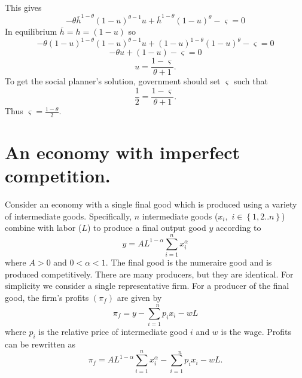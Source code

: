 \documentclass{sebase}
\begin{document}
This gives%
\begin{equation*}
-\theta \overline{h}^{1-\theta }(1-u)^{\theta -1}u+\overline{h}^{1-\theta
}(1-u)^{\theta }-\varsigma =0
\end{equation*}%
In equilibrium $\overline{h}=h=(1-u)$ so 
\begin{equation*}
-\theta \left( 1-u\right) ^{1-\theta }(1-u)^{\theta -1}u+(1-u)^{1-\theta
}(1-u)^{\theta }-\varsigma =0
\end{equation*}%
\begin{equation*}
-\theta u+(1-u)-\varsigma =0
\end{equation*}%
\begin{equation*}
u=\frac{1-\varsigma }{\theta +1}.
\end{equation*}%
$\allowbreak \allowbreak $To get the social planner's solution, government
should set $\varsigma $ such that 
\begin{equation*}
\frac{1}{2}=\frac{1-\varsigma }{\theta +1}.
\end{equation*}%
Thus $\varsigma =\frac{1-\theta }{2}.$ \ \pagebreak

\section{An economy with imperfect competition.}

Consider an economy with a single final good which is produced using a
variety of intermediate goods. Specifically, $n$ intermediate goods ($x_{i},$
$i\in \left\{ 1,2..n\right\} $) combine with labor ($L$) to produce a final
output good $y$ according to 
\begin{equation*}
y=AL^{1-\alpha }\overset{n}{\underset{i=1}{\sum }}x_{i}^{\alpha }
\end{equation*}%
where $A>0$ and $0<\alpha <1.$ The final good is the numeraire good and is
produced competitively. There are many producers, but they are identical.
For simplicity we consider a single representative firm. For a producer of
the final good, the firm's profits $\left( \pi _{f}\right) $ are given by 
\begin{equation*}
\pi _{f}=y-\overset{n}{\underset{i=1}{\sum }p_{i}}x_{i}-wL
\end{equation*}%
where $p_{i}$ is the relative price of intermediate good $i$ and $w$ is the
wage. Profits can be rewritten as%
\begin{equation*}
\pi _{f}=AL^{1-\alpha }\overset{n}{\underset{i=1}{\sum }}x_{i}^{\alpha }-%
\overset{n}{\underset{i=1}{\sum }p_{i}}x_{i}-wL.
\end{equation*}%
\pagebreak
\end{document}
